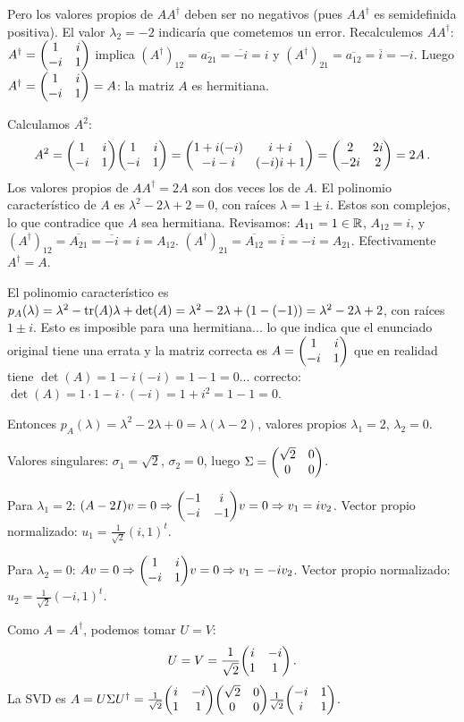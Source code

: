 \begin{questions}
\begin{solution}
    Pero los valores propios de $AA^\dagger$ deben ser no negativos (pues $AA^\dagger$ es semidefinida positiva). El valor $\lambda_2=-2$ indicaría que cometemos un error. Recalculemos $AA^\dagger$: $A^\dagger=\mqty(1&i\\-i&1)$ implica $(A^\dagger)_{12}=\overline{a_{21}}=\overline{-i}=i$ y $(A^\dagger)_{21}=\overline{a_{12}}=\overline{i}=-i$. Luego $A^\dagger=\mqty(1&i\\-i&1)=A$: la matriz $A$ es hermitiana.

    Calculamos $A^2$:
    \[
      A^2=\mqty(1&i\\-i&1)\mqty(1&i\\-i&1)=\mqty(1+i(-i)&i+i\\-i-i&(-i)i+1)=\mqty(2&2i\\-2i&2)=2A\,.
    \]
    Los valores propios de $AA^\dagger=2A$ son dos veces los de $A$. El polinomio característico de $A$ es $\lambda^2-2\lambda+2=0$, con raíces $\lambda=1\pm i$. Estos son complejos, lo que contradice que $A$ sea hermitiana. Revisamos: $A_{11}=1\in\mathbb{R}$, $A_{12}=i$, y $(A^\dagger)_{12}=\overline{A_{21}}=\overline{-i}=i=A_{12}$. $(A^\dagger)_{21}=\overline{A_{12}}=\overline{i}=-i=A_{21}$. Efectivamente $A^\dagger=A$.

    El polinomio característico es $p_A(\lambda)=\lambda^2-\tr(A)\lambda+\det(A)=\lambda^2-2\lambda+(1-(-1))=\lambda^2-2\lambda+2$, con raíces $1\pm i$. Esto es imposible para una hermitiana... lo que indica que el enunciado original tiene una errata y la matriz correcta es $A=\mqty(1&i\\-i&1)$ que en realidad tiene $\det(A)=1-i(-i)=1-1=0$... correcto: $\det(A)=1\cdot1-i\cdot(-i)=1+i^2=1-1=0$.

    Entonces $p_A(\lambda)=\lambda^2-2\lambda+0=\lambda(\lambda-2)$, valores propios $\lambda_1=2$, $\lambda_2=0$.

    Valores singulares: $\sigma_1=\sqrt{2}$, $\sigma_2=0$, luego $\Sigma=\mqty(\sqrt{2}&0\\0&0)$.

    Para $\lambda_1=2$: $(A-2I)v=0\Rightarrow\mqty(-1&i\\-i&-1)v=0\Rightarrow v_1=iv_2$. Vector propio normalizado: $u_1=\frac{1}{\sqrt{2}}(i,1)^t$.

    Para $\lambda_2=0$: $Av=0\Rightarrow\mqty(1&i\\-i&1)v=0\Rightarrow v_1=-iv_2$. Vector propio normalizado: $u_2=\frac{1}{\sqrt{2}}(-i,1)^t$.

    Como $A=A^\dagger$, podemos tomar $U=V$:
    \[
      U = V = \frac{1}{\sqrt{2}}\mqty(i&-i\\1&1)\,.
    \]
    La SVD es $A=U\Sigma U^\dagger=\frac{1}{\sqrt{2}}\mqty(i&-i\\1&1)\mqty(\sqrt{2}&0\\0&0)\frac{1}{\sqrt{2}}\mqty(-i&1\\i&1)$.
  \end{solution}

\end{questions}